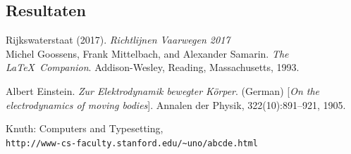 \documentclass{article}
\begin{document}
\subsection{Resultaten}



\clearpage

\newpage

\newpage
\begin{thebibliography}{9}
Rijkswaterstaat (2017).
\textit{Richtlijnen Vaarwegen 2017}\\

Michel Goossens, Frank Mittelbach, and Alexander Samarin. 
\textit{The \LaTeX\ Companion}. 
Addison-Wesley, Reading, Massachusetts, 1993.

Albert Einstein. 
\textit{Zur Elektrodynamik bewegter K{\"o}rper}. (German) 
[\textit{On the electrodynamics of moving bodies}]. 
Annalen der Physik, 322(10):891–921, 1905.

Knuth: Computers and Typesetting,
\\\texttt{http://www-cs-faculty.stanford.edu/\~{}uno/abcde.html}
\end{thebibliography}
\end{document}
